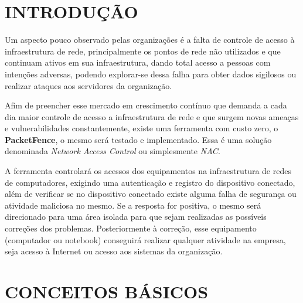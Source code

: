\documentclass[12pt, brazil, ruledheader, pnumromarab,normaltoc]{abnt}
\begin{document}
\chapter{INTRODUÇÃO}
Um aspecto pouco observado pelas organizações é a falta de controle de acesso à infraestrutura de rede, principalmente os pontos de rede não utilizados e que continuam ativos em sua infraestrutura, dando total acesso a pessoas com intenções adversas, podendo explorar-se dessa falha para obter dados sigilosos ou realizar ataques aos servidores da organização.
\par
Afim de preencher esse mercado em crescimento contínuo que demanda a cada dia maior controle de acesso a infraestrutura de rede e que surgem novas ameaças e vulnerabilidades constantemente, existe uma ferramenta com custo zero, o \textbf{PacketFence}, o mesmo será testado e implementado. Essa é uma solução denominada \textit{Network Access Control}  ou simplesmente \emph{NAC}.
\par
A ferramenta controlará os acessos dos equipamentos na infraestrutura de redes de computadores, exigindo uma autenticação e registro do dispositivo conectado, além de verificar se no dispositivo conectado existe alguma falha de segurança ou atividade maliciosa no mesmo. Se a resposta for positiva, o mesmo será direcionado para uma área isolada para que sejam realizadas as possíveis correções dos problemas. Posteriormente à correção, esse equipamento (computador ou notebook) conseguirá realizar qualquer atividade na empresa, seja acesso à Internet ou acesso aos sistemas da organização.

\chapter{CONCEITOS BÁSICOS}
\end{document}
